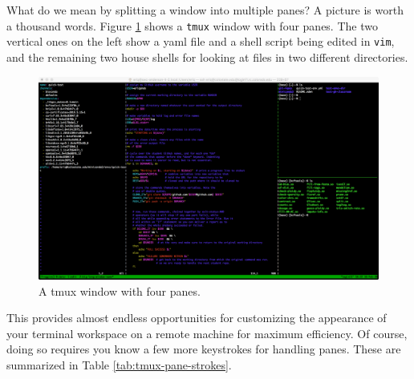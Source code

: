 \documentclass[]{krantz}
\begin{document}
What do we mean by splitting a window into multiple panes? A picture is
worth a thousand words. Figure \ref{fig:tmux-4-panes} shows a \texttt{tmux}
window with four panes. The two vertical ones on the left show a yaml
file and a shell script being edited in \texttt{vim}, and the remaining two
house shells for looking at files in two different directories.

\begin{figure}

{\centering \includegraphics{figs/tmux-4-panes} 

}

\caption{A tmux window with four panes.}\label{fig:tmux-4-panes}
\end{figure}

This provides almost endless opportunities for customizing the
appearance of your terminal workspace on a remote machine for maximum
efficiency. Of course, doing so requires you know a few more
keystrokes for handling panes. These are summarized in Table \ref{tab:tmux-pane-strokes}.
\end{document}
